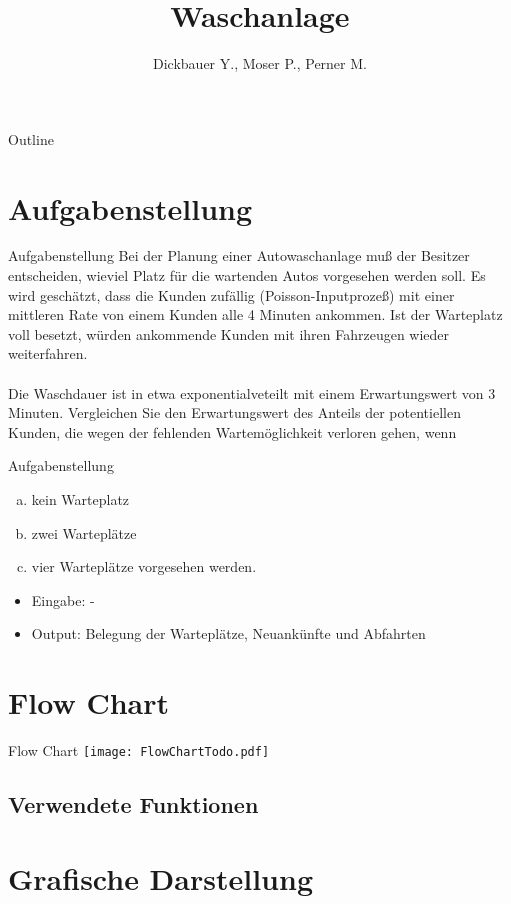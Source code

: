 

\title[BSP24 - Waschanlage]{Waschanlage}
\author{Dickbauer Y., Moser P., Perner M.}



\begin{frame}
  \titlepage
\end{frame}

\begin{frame}{Outline}
  \tableofcontents
\end{frame}

\section{Aufgabenstellung}
\begin{frame}{Aufgabenstellung}
Bei der Planung einer Autowaschanlage muß der Besitzer entscheiden, wieviel Platz für
die wartenden Autos vorgesehen werden soll. Es wird geschätzt, dass die Kunden zufällig
(Poisson-Inputprozeß) mit einer mittleren Rate von einem Kunden alle 4 Minuten ankommen.
Ist der Warteplatz voll besetzt, würden ankommende Kunden mit ihren Fahrzeugen
wieder weiterfahren. \\~\\ Die Waschdauer ist in etwa exponentialveteilt mit einem Erwartungswert
von 3 Minuten. Vergleichen Sie den Erwartungswert des Anteils der potentiellen
Kunden, die wegen der fehlenden Wartemöglichkeit verloren gehen, wenn
\end{frame}

\begin{frame}{Aufgabenstellung}
\begin{enumerate}[(a)]
	\item kein Warteplatz
	\item zwei Warteplätze
	\item vier Warteplätze vorgesehen werden.
\end{enumerate}

\begin{itemize}
  \item Eingabe: -
  \item Output: Belegung der Warteplätze, Neuankünfte und Abfahrten
\end{itemize}
\end{frame}

\section{Flow Chart}
\begin{frame}{Flow Chart}
	\centering
  	\texttt{[image: FlowChartTodo.pdf]}
\end{frame}

\subsection{Verwendete Funktionen}
%

\section{Grafische Darstellung}


